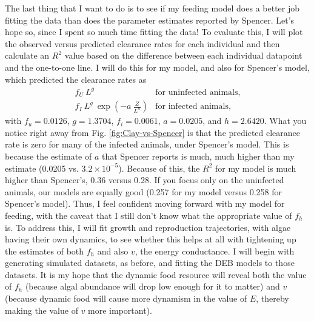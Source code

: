 \documentclass[12pt,reqno,final,pdftex]{amsart}\usepackage[]{graphicx}\usepackage[]{color}
\theoremstyle{plain}
\numberwithin{equation}{part}
\begin{document}
The last thing that I want to do is to see if my feeding model does a better job fitting the data than does the parameter estimates reported by Spencer.
Let's hope so, since I spent so much time fitting the data!
To evaluate this, I will plot the observed versus predicted clearance rates for each individual and then calculate an $R^2$ value based on the difference between each individual datapoint and the one-to-one line.
I will do this for my model, and also for Spencer's model, which predicted the clearance rates as
\begin{align}
f_U~L^g & \text{for uninfected animals}, \\
f_I~L^g~\exp\left(-a~\frac{Z}{L^h}\right) & \text{for infected animals},
\end{align}
with $f_u = 0.0126$, $g=1.3704$, $f_i=0.0061$, $a=0.0205$, and $h=2.6420$.
What you notice right away from Fig. \ref{fig:Clay-vs-Spencer} is that the predicted clearance rate is zero for many of the infected animals, under Spencer's model.
This is because the estimate of $a$ that Spencer reports is much, much higher than my estimate (0.0205 vs. $3.2\times10^{-5}$).
Because of this, the $R^2$ for my model is much higher than Spencer's, 0.36 versus 0.28.
If you focus only on the uninfected animals, our models are equally good (0.257 for my model versus 0.258 for Spencer's model).
Thus, I feel confident moving forward with my model for feeding, with the caveat that I still don't know what the appropriate value of $f_h$ is.
To address this, I will fit growth and reproduction trajectories, with algae having their own dynamics, to see whether this helps at all with tightening up the estimates of both $f_h$ and also $v$, the energy conductance.
I will begin with generating simulated datasets, as before, and fitting the DEB models to those datasets.
It is my hope that the dynamic food resource will reveal both the value of $f_h$ (because algal abundance will drop low enough for it to matter) and $v$ (because dynamic food will cause more dynamism in the value of $E$, thereby making the value of $v$ more important).
\end{document}
